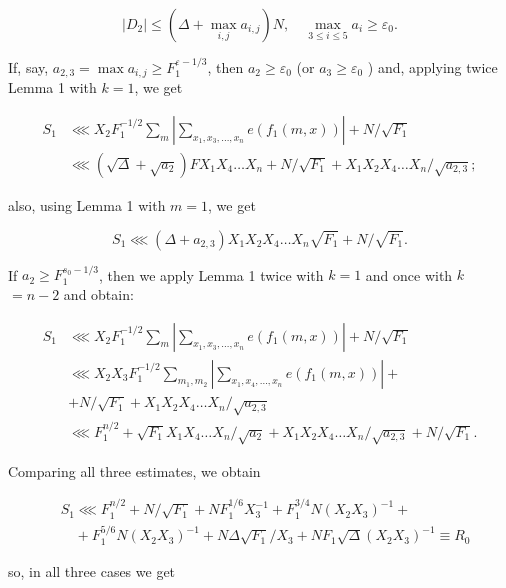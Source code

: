 \documentclass[10pt]{article}
\begin{document}
$$
\left|D_{2}\right| \leqslant\left(\Delta+\max _{i, j} a_{i, j}\right) N, \quad \max _{3 \leqslant i \leqslant 5} a_{i} \geqslant \varepsilon_{0} .
$$

If, say, $a_{2,3}=\max a_{i, j} \geqslant F_{1}^{\varepsilon-1 / 3}$, then $a_{2} \geqslant \varepsilon_{0}$ (or $a_{3} \geqslant \varepsilon_{0}$ ) and, applying twice Lemma 1 with $k=1$, we get

$$
\begin{aligned}
S_{1} & \lll X_{2} F_{1}^{-1 / 2} \sum_{m}\left|\sum_{x_{1}, x_{3}, \ldots, x_{n}} e\left(f_{1}(m, x)\right)\right|+N / \sqrt{F_{1}} \\
& \lll\left(\sqrt{\Delta}+\sqrt{a_{2}}\right) F X_{1} X_{4} \ldots X_{n}+N / \sqrt{F_{1}}+X_{1} X_{2} X_{4} \ldots X_{n} / \sqrt{a_{2,3}} ;
\end{aligned}
$$

also, using Lemma 1 with $m=1$, we get

$$
S_{1} \lll\left(\Delta+a_{2,3}\right) X_{1} X_{2} X_{4} \ldots X_{n} \sqrt{F_{1}}+N / \sqrt{F_{1}} .
$$

If $a_{2} \geqslant F_{1}^{s_{0}-1 / 3}$, then we apply Lemma 1 twice with $k=1$ and once with $k$ $=n-2$ and obtain:

$$
\begin{aligned}
S_{1} & \lll X_{2} F_{1}^{-1 / 2} \sum_{m}\left|\sum_{x_{1}, x_{3}, \ldots, x_{n}} e\left(f_{1}(m, x)\right)\right|+N / \sqrt{F_{1}} \\
& \lll X_{2} X_{3} F_{1}^{-1 / 2} \sum_{m_{1}, m_{2}}\left|\sum_{x_{1}, x_{4}, \ldots, x_{n}} e\left(f_{1}(m, x)\right)\right|+ \\
& +N / \sqrt{F_{1}}+X_{1} X_{2} X_{4} \ldots X_{n} / \sqrt{a_{2,3}} \\
& \lll F_{1}^{n / 2}+\sqrt{F_{1}} X_{1} X_{4} \ldots X_{n} / \sqrt{a_{2}}+X_{1} X_{2} X_{4} \ldots X_{n} / \sqrt{a_{2,3}}+N / \sqrt{F_{1}} .
\end{aligned}
$$

Comparing all three estimates, we obtain

$$
\begin{aligned}
& S_{1} \lll F_{1}^{n / 2}+N / \sqrt{F_{1}}+N F_{1}^{1 / 6} X_{3}^{-1}+F_{1}^{3 / 4} N\left(X_{2} X_{3}\right)^{-1}+ \\
& \quad+F_{1}^{5 / 6} N\left(X_{2} X_{3}\right)^{-1}+N \Delta \sqrt{F_{1}} / X_{3}+N F_{1} \sqrt{\Delta}\left(X_{2} X_{3}\right)^{-1} \equiv R_{0}
\end{aligned}
$$

so, in all three cases we get
\end{document}
